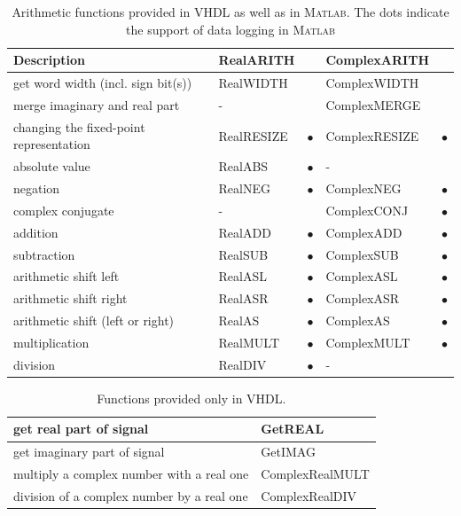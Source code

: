 \documentclass[a4paper,11pt]{article}
\begin{document}
\begin{table}
  \centering
  \begin{tabular}{|l|l|c|l|c|}
    \hline
    Description & RealARITH & & ComplexARITH & \\
    \hline
    get word width (incl. sign bit(s)) & RealWIDTH & & ComplexWIDTH & \\
    merge imaginary and real part & - & & ComplexMERGE & \\
    changing the fixed-point representation & RealRESIZE & $\bullet$ &
    ComplexRESIZE & $\bullet$  \\
    absolute value & RealABS & $\bullet$ & - & \\
    negation & RealNEG & $\bullet$ &  ComplexNEG & $\bullet$ \\
    complex conjugate & - & & ComplexCONJ & $\bullet$ \\
    addition & RealADD & $\bullet$ & ComplexADD & $\bullet$ \\
    subtraction & RealSUB & $\bullet$ & ComplexSUB & $\bullet$ \\
    arithmetic shift left & RealASL & $\bullet$ & ComplexASL & $\bullet$ \\
    arithmetic shift right & RealASR & $\bullet$ &ComplexASR & $\bullet$ \\
    arithmetic shift (left or right) & RealAS & $\bullet$ & ComplexAS & $\bullet$ \\
    multiplication & RealMULT & $\bullet$ & ComplexMULT & $\bullet$ \\
    division & RealDIV & $\bullet$ & - & \\
    \hline
  \end{tabular}
  \caption{Arithmetic functions provided in VHDL as well as
    in \textsc{Matlab}. The dots indicate the support of data logging in \textsc{Matlab}} 
  \label{tab_arith_functions}
\end{table}

\begin{table}
  \centering
  \begin{tabular}{|l|l|}
    \hline
    get real part of signal & GetREAL \\
    \hline
    get imaginary part of signal & GetIMAG \\
    \hline
    multiply a complex number with a real one & ComplexRealMULT \\
    \hline
    division of a complex number by a real one & ComplexRealDIV \\
    \hline
  \end{tabular}
  \caption{Functions provided only in VHDL.} 
  \label{tab_VHDL_functions}
\end{table}
\end{document}
